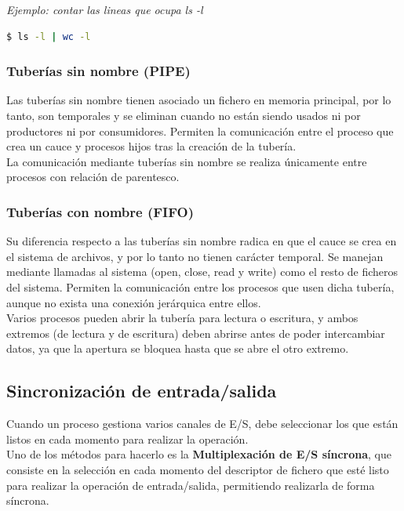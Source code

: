 \textit{Ejemplo: contar las lineas que ocupa ls -l}
\begin{lstlisting}[language=bash,numbers=none]
    $ ls -l | wc -l
\end{lstlisting}

\subsubsection{Tuberías sin nombre (PIPE)}
Las tuberías sin nombre tienen asociado un fichero en memoria principal, por lo tanto, son temporales y se eliminan cuando no están siendo usados ni por productores ni por consumidores. Permiten la comunicación entre el proceso que crea un cauce y procesos hijos tras la creación de la tubería.\\

La comunicación mediante tuberías sin nombre se realiza únicamente entre procesos con relación de parentesco.
\subsubsection{Tuberías con nombre (FIFO)}
Su diferencia respecto a las tuberías sin nombre radica en que el cauce se crea en el sistema de archivos, y por lo tanto no tienen carácter temporal. Se manejan mediante llamadas al sistema (open, close, read y write) como el resto de ficheros del sistema. Permiten la comunicación entre los procesos que usen dicha tubería, aunque no exista una conexión jerárquica entre ellos.\\

Varios procesos pueden abrir la tubería para lectura o escritura, y ambos extremos (de lectura y de escritura) deben abrirse antes de poder intercambiar datos, ya que la apertura se bloquea hasta que se abre el otro extremo.
\subsection{Sincronización de entrada/salida}
Cuando un proceso gestiona varios canales de E/S, debe seleccionar los que están listos en cada momento para realizar la operación.\\

Uno de los métodos para hacerlo es la \textbf{Multiplexación de E/S síncrona}, que consiste en la selección en cada momento del descriptor de fichero que esté listo para realizar la operación de entrada/salida, permitiendo realizarla de forma síncrona.

\newpage
